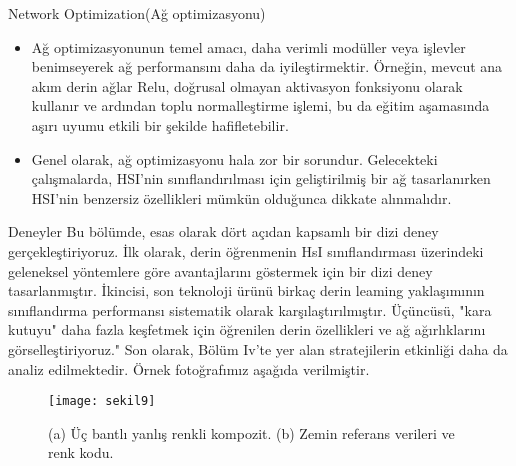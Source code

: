 \documentclass{beamer}
\begin{document}
\begin{frame}{Network Optimization(Ağ optimizasyonu)}
\begin{itemize}
  \item Ağ optimizasyonunun temel amacı, daha verimli modüller veya işlevler benimseyerek ağ performansını daha da iyileştirmektir. Örneğin, mevcut ana akım derin ağlar Relu, doğrusal olmayan aktivasyon fonksiyonu olarak kullanır ve ardından toplu normalleştirme işlemi, bu da eğitim aşamasında aşırı uyumu etkili bir şekilde hafifletebilir.
  \item Genel olarak, ağ optimizasyonu hala zor bir sorundur. Gelecekteki çalışmalarda, HSI'nin sınıflandırılması için geliştirilmiş bir ağ tasarlanırken HSI'nin benzersiz özellikleri mümkün olduğunca dikkate alınmalıdır.
\end{itemize}
\end{frame}

\begin{frame}{Deneyler}
Bu bölümde, esas olarak dört açıdan kapsamlı bir dizi deney gerçekleştiriyoruz. İlk olarak, derin öğrenmenin HsI sınıflandırması üzerindeki geleneksel yöntemlere göre avantajlarını göstermek için bir dizi deney tasarlanmıştır. İkincisi, son teknoloji ürünü birkaç derin leaming yaklaşımının sınıflandırma performansı sistematik olarak karşılaştırılmıştır. Üçüncüsü, "kara kutuyu" daha fazla keşfetmek için öğrenilen derin özellikleri ve ağ ağırlıklarını görselleştiriyoruz." Son olarak, Bölüm Iv'te yer alan stratejilerin etkinliği daha da analiz edilmektedir. Örnek fotoğrafımız aşağıda verilmiştir.
\end{frame}

\begin{frame}
  \begin{figure}[]
    \centering
    \texttt{[image: sekil9]}
    \label{fig:sekil5}
    \caption{(a) Üç bantlı yanlış renkli kompozit. (b) Zemin referans verileri ve renk kodu.} 
  \end{figure}
\end{frame}


\end{document}
